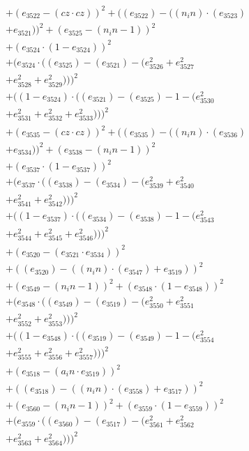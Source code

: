 \documentclass[10pt, a4paper]{article}
\begin{document}
\begin{small}
\begin{align*}
& + (e_{3522} - (cz  \cdot  cz))^{2} + ((e_{3522}) - ((n_in)  \cdot  (e_{3523}) \\
& + e_{3521}))^{2} + (e_{3525} - (n_in - 1))^{2} \\
& + (e_{3524}  \cdot  (1 - e_{3524}))^{2} \\
& + (e_{3524}  \cdot  ((e_{3525}) - (e_{3521}) - (e_{3526}^{2} + e_{3527}^{2} \\
& + e_{3528}^{2} + e_{3529}^{2})))^{2} \\
& + ((1 - e_{3524})  \cdot  ((e_{3521}) - (e_{3525}) - 1 - (e_{3530}^{2} \\
& + e_{3531}^{2} + e_{3532}^{2} + e_{3533}^{2})))^{2} \\
& + (e_{3535} - (cz  \cdot  cz))^{2} + ((e_{3535}) - ((n_in)  \cdot  (e_{3536}) \\
& + e_{3534}))^{2} + (e_{3538} - (n_in - 1))^{2} \\
& + (e_{3537}  \cdot  (1 - e_{3537}))^{2} \\
& + (e_{3537}  \cdot  ((e_{3538}) - (e_{3534}) - (e_{3539}^{2} + e_{3540}^{2} \\
& + e_{3541}^{2} + e_{3542}^{2})))^{2} \\
& + ((1 - e_{3537})  \cdot  ((e_{3534}) - (e_{3538}) - 1 - (e_{3543}^{2} \\
& + e_{3544}^{2} + e_{3545}^{2} + e_{3546}^{2})))^{2} \\
& + (e_{3520} - (e_{3521}  \cdot  e_{3534}))^{2} \\
& + ((e_{3520}) - ((n_in)  \cdot  (e_{3547}) + e_{3519}))^{2} \\
& + (e_{3549} - (n_in - 1))^{2} + (e_{3548}  \cdot  (1 - e_{3548}))^{2} \\
& + (e_{3548}  \cdot  ((e_{3549}) - (e_{3519}) - (e_{3550}^{2} + e_{3551}^{2} \\
& + e_{3552}^{2} + e_{3553}^{2})))^{2} \\
& + ((1 - e_{3548})  \cdot  ((e_{3519}) - (e_{3549}) - 1 - (e_{3554}^{2} \\
& + e_{3555}^{2} + e_{3556}^{2} + e_{3557}^{2})))^{2} \\
& + (e_{3518} - (a_in  \cdot  e_{3519}))^{2} \\
& + ((e_{3518}) - ((n_in)  \cdot  (e_{3558}) + e_{3517}))^{2} \\
& + (e_{3560} - (n_in - 1))^{2} + (e_{3559}  \cdot  (1 - e_{3559}))^{2} \\
& + (e_{3559}  \cdot  ((e_{3560}) - (e_{3517}) - (e_{3561}^{2} + e_{3562}^{2} \\
& + e_{3563}^{2} + e_{3564}^{2})))^{2} \\

\end{align*}
\end{small}
\end{document}
